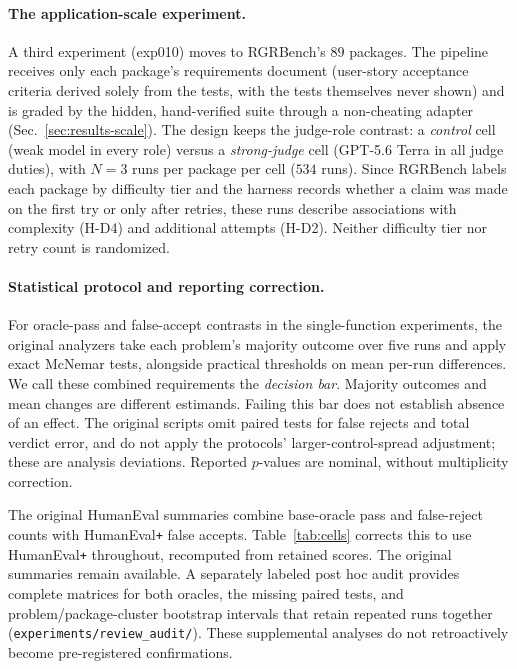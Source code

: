\documentclass{article}
\begin{document}
\paragraph{The application-scale experiment.} A third experiment (exp010) moves to
RGRBench's $89$ packages. The pipeline receives only each package's requirements document
(user-story acceptance criteria derived solely from the tests, with the tests themselves never
shown) and is graded by the hidden, hand-verified suite through a non-cheating adapter
(Sec.~\ref{sec:results-scale}). The design keeps the judge-role contrast: a \emph{control} cell (weak model in every role) versus a \emph{strong-judge}
cell (GPT-5.6 Terra in all judge duties), with $N{=}3$ runs per package per cell ($534$ runs). Since
RGRBench labels each package by difficulty tier and the harness records whether a claim was made on
the first try or only after retries, these runs describe associations with complexity (H-D4) and additional attempts (H-D2).
Neither difficulty tier nor retry count is randomized.

\paragraph{Statistical protocol and reporting correction.} For oracle-pass and false-accept
contrasts in the single-function experiments, the original analyzers take each problem's
majority outcome over five runs and apply exact McNemar tests, alongside practical thresholds
on mean per-run differences. We call these combined requirements the \emph{decision bar}.
Majority outcomes and mean changes are different estimands. Failing this bar does not establish
absence of an effect. The original scripts omit paired tests for false rejects and total
verdict error, and do not apply the protocols' larger-control-spread adjustment; these are
analysis deviations. Reported $p$-values are nominal, without multiplicity correction.

The original HumanEval summaries combine base-oracle pass and false-reject counts with
HumanEval\texttt{+} false accepts. Table~\ref{tab:cells} corrects this to use
HumanEval\texttt{+} throughout, recomputed from retained scores. The original summaries
remain available. A separately labeled post hoc audit provides complete matrices for both
oracles, the missing paired tests, and problem/package-cluster bootstrap intervals that
retain repeated runs together (\texttt{experiments/review\_audit/}). These supplemental
analyses do not retroactively become pre-registered confirmations.
\end{document}

